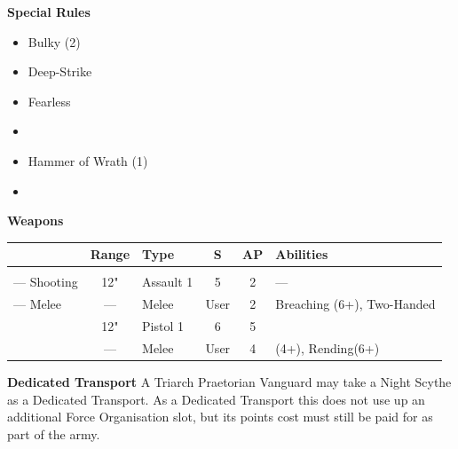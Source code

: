 \begin{minipage}[t]{0.72\textwidth}
\begin{minipage}[t]{0.5\textwidth}
\begin{flushleft}
			\textbf{Special Rules}
			\begin{itemize}
				\item Bulky (2)
				\item Deep-Strike
				\item Fearless
				\item {}
				\item Hammer of Wrath (1)
				\item {}
			\end{itemize}
		\end{flushleft}
	\end{minipage}
	
	\vspace*{2em}
	\textbf{Weapons}
	
	\begin{tabular}{L{90 pt} c C{40pt} *{2}{c} >{\raggedright\arraybackslash}p{130pt}}
		& Range & Type & S & AP & Abilities \\
		\hline
		 &  &  &  &  & \\
		— Shooting & 12" & Assault 1 & 5 & 2 & — \\
		— Melee & — & Melee & User & 2 & Breaching (6+), Two-Handed \\
		 & 12" & Pistol 1 & 6 & 5 & \\
		 & — & Melee & User & 4 &  (4+), Rending(6+) \\
	\end{tabular}
	
	\vspace*{2em}
	\textbf{Dedicated Transport}
	A Triarch Praetorian Vanguard may take a Night Scythe as a Dedicated Transport. As a Dedicated Transport this does not use up an additional Force Organisation slot, but its points cost must still be paid for as part of the army.
	

\end{minipage}
